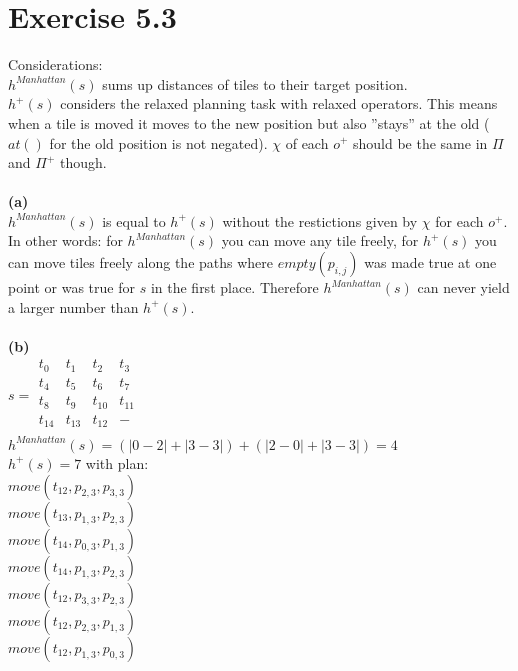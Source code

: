 \documentclass[11pt,a4paper]{article}
\begin{document}
\section*{Exercise 5.3}
Considerations:\\
$h^{Manhattan}(s)$ sums up distances of tiles to their target position.\\
$h^+(s)$ considers the relaxed planning task with relaxed operators. This means when a tile is moved it moves to the new position but also ''stays'' at the old ($at()$ for the old position is not negated). $\chi$ of each $o^+$ should be the same in $\Pi$ and $\Pi^+$ though.\\
\\
\textbf{(a)}\\
$h^{Manhattan}(s)$ is equal to $h^+(s)$ without the restictions given by $\chi$ for each $o^+$. In other words: for $h^{Manhattan}(s)$ you can move any tile freely, for $h^+(s)$ you can move tiles freely along the paths where $empty(p_{i,j})$ was made true at one point or was true for $s$ in the first place. Therefore $h^{Manhattan}(s)$ can never yield a larger number than $h^+(s)$.\\
\\
\textbf{(b)}\\
$s = \begin{matrix}
t_0 & t_1 & t_2 & t_3 \\
t_4 & t_5 & t_6 & t_7 \\
t_8 & t_9 & t_{10} & t_{11} \\
t_{14} & t_{13} & t_{12} & - \\
\end{matrix}$\\
$h^{Manhattan}(s)=(|0-2|+|3-3|)+(|2-0|+|3-3|)=4$\\
$h^+(s)=7$ with plan:\\ %
$move(t_{12},p_{2,3},p_{3,3})$\\
$move(t_{13},p_{1,3},p_{2,3})$\\
$move(t_{14},p_{0,3},p_{1,3})$\\
$move(t_{14},p_{1,3},p_{2,3})$\\
$move(t_{12},p_{3,3},p_{2,3})$\\
$move(t_{12},p_{2,3},p_{1,3})$\\
$move(t_{12},p_{1,3},p_{0,3})$
\end{document}
